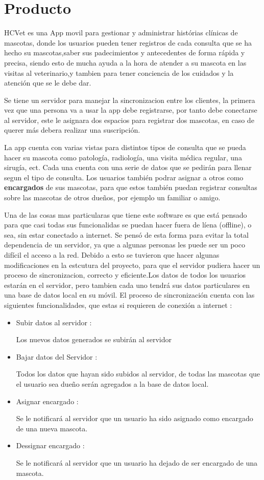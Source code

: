 \chapter{Producto}\label{chapter:proposal}
HCVet es una App movil para gestionar y administrar histórias clínicas de mascotas, donde los usuarios pueden tener registros de cada consulta que se ha hecho su mascotas,saber sus padecimientos y antecedentes de forma rápida y precisa, siendo esto de mucha ayuda a la hora de atender a su mascota en las visitas al veterinario,y tambien para tener conciencia de los cuidados y la atención que se le debe dar.

Se tiene un servidor para manejar la sincronizacion entre los clientes, la primera vez que una persona va a usar la app debe registrarse, por tanto debe conectarse al servidor, este le asignara dos espacios para registrar dos mascotas, en caso de querer más debera realizar una suscripción.

La app cuenta con varias vistas para distintos tipos de consulta que se pueda hacer su mascota como patología, radiología, una visita médica regular, una sirugía, ect. Cada una cuenta con una serie de datos que se pedirán para llenar segun el tipo de consulta. Los usuarios también podrar asignar a otros como \textbf{encargados} de sus mascotas, para que estos también puedan registrar consultas sobre  las mascotas de otros dueños, por ejemplo un familiar o amigo.

Una de las cosas mas particularas que tiene este software es que está pensado para que casi todas sus funcionalidas se puedan hacer fuera de líena (offline), o sea, sin estar conectado a internet. Se pensó de esta forma para evitar la total dependencia de un servidor, ya que a algunas personas les puede ser un poco difícil el acceso a la red. Debido a esto se tuvieron que hacer algunas modificaciones en la estcutura del proyecto, para que el servidor pudiera hacer un proceso de sincronizacion, correcto y eficiente.Los datos de todos los usuarios estarán en el servidor, pero tambien cada uno tendrá sus datos particulares en una base de datos local en su móvil. El proceso de sincronización cuenta con las siguientes funcionalidades, que estas si requieren de conexión a internet :
\begin{itemize}
	\item Subir datos al servidor :
	
	Los nuevos datos generados se subirán al servidor
	
	\item Bajar datos del Servidor :
	
	Todos los datos que hayan sido subidos al servidor, de todas las mascotas que el usuario sea dueño serán agregados a la base de datos local. 
	
	\item Asignar encargado :
	
	Se le notificará al servidor que un usuario ha sido asignado como encargado de una nueva mascota.  
	
		\item Dessignar encargado :
	
	Se le notificará al servidor que un usuario ha dejado de ser  encargado de una mascota.  
\end{itemize}

  
 

